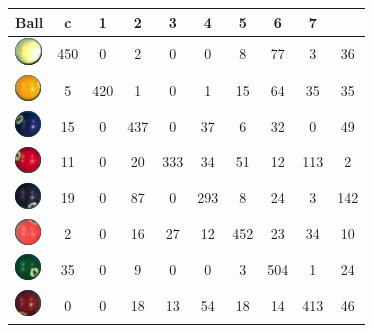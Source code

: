 \begin{table}[htpb]
\begin{center}
	\begin{tabular}{|l|c|c|c|c|c|c|c|c|c|}
		\hline
		Ball & c & \cellcolor{yellow}1 & \cellcolor{blue}2 & \cellcolor{red}3  & \cellcolor{purple}4 & \cellcolor{orange}5 & \cellcolor{green}6 & \cellcolor{brown}7 & \cellcolor{black}\textcolor{white}{8} \\
		\hline
		\includegraphics[]{images/ballsInVotes/0} & \cellcolor{gray}450 & 0 & 2 & 0 & 0 & 8 & 77 & 3 & 36\\
		\hline
		\includegraphics[]{images/ballsInVotes/1} & 5 & \cellcolor{gray}420 & 1 & 0 & 1 & 15 & 64 & 35 & 35\\
		\hline
		\includegraphics[]{images/ballsInVotes/2} & 15 & 0 & \cellcolor{gray}437 & 0 & 37 & 6 & 32 & 0 & 49\\
		\hline
		\includegraphics[]{images/ballsInVotes/3} & 11 & 0 & 20 & \cellcolor{gray}333 & 34 & 51 & 12 & 113 & 2\\
		\hline
		\includegraphics[]{images/ballsInVotes/4} & 19 & 0 & 87 & 0 & \cellcolor{gray}293 & 8 & 24 & 3 & 142\\
		\hline
		\includegraphics[]{images/ballsInVotes/5} & 2 & 0 & 16 & 27 & 12 & \cellcolor{gray}452 & 23 & 34 & 10\\
		\hline
		\includegraphics[]{images/ballsInVotes/6} & 35 & 0 & 9 & 0 & 0 & 3 & \cellcolor{gray}504 & 1 & 24\\
		\hline
		\includegraphics[]{images/ballsInVotes/7} & 0 & 0 & 18 & 13 & 54 & 18 & 14 & \cellcolor{gray}413 & 46\\

\end{tabular}
\end{center}
\end{table}
